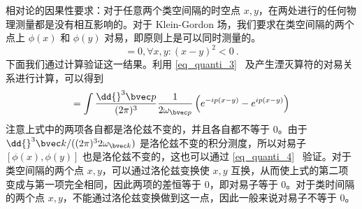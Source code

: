 
相对论的因果性要求：对于任意两个类空间隔的时空点 $x,y$，在两处进行的任何物理测量都是没有相互影响的。对于 Klein-Gordon 场，我们要求在类空间隔的两个点上 $\phi(x)$ 和 $\phi(y)$ 对易，即原则上是可以同时测量的。
\begin{equation}
[\phi(x),\phi(y)]=0,\forall x,y:(x-y)^2<0~.
\end{equation}
下面我们通过计算验证这一结果。利用 \autoref{eq_quanti_3}~ 及产生湮灭算符的对易关系进行计算，可以得到
\begin{equation}
[\phi(x),\phi(y)]=\int \frac{\dd{}^3 \bvec p}{(2\pi)^3} \frac{1}{2\omega_{\bvec p}}
\left( e^{-ip(x-y)}-e^{ip(x-y)}\right)
\end{equation}
注意上式中的两项各自都是洛伦兹不变的，并且各自都不等于 $0$。由于 $\dd{}^3 \bvec k/((2\pi)^3 2\omega_{\bvec k})$ 是洛伦兹不变的积分测度，所以对易子 $[\phi(x),\phi(y)]$ 也是洛伦兹不变的，这也可以通过 \autoref{eq_quanti_4}~ 验证。对于类空间隔的两个点 $x,y$，可以通过洛伦兹变换使 $x,y$ 互换，从而使上式的第二项变成与第一项完全相同，因此两项的差恒等于 $0$，即对易子等于 $0$。对于类时间隔的两个点 $x,y$，不能通过洛伦兹变换做到这一点，因此一般来说对易子不等于 $0$。



